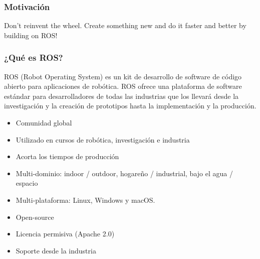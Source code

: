 \begin{frame}
	\frametitle{Motivación}
	
	Don’t reinvent the wheel. Create something new and do it faster and better by building on ROS!
	
	
	
	
	
	
\end{frame}

\begin{frame}
	\frametitle{¿Qué es ROS?}
	
	ROS (Robot Operating System) es un kit de desarrollo de software de código abierto para aplicaciones de robótica. ROS ofrece una plataforma de software estándar para desarrolladores de todas las industrias que los llevará desde la investigación y la creación de prototipos hasta la implementación y la producción.
	
	\begin{itemize}
		\item Comunidad global
		\item Utilizado en cursos de robótica, investigación e industria
		\item Acorta los tiempos de producción
		\item Multi-dominio: indoor / outdoor, hogareño / industrial, bajo el agua / espacio
		\item Multi-plataforma: Linux, Windows y macOS.
		\item Open-source
		\item Licencia permisiva (Apache 2.0)
		\item Soporte desde la industria
	\end{itemize}
	
	
	
	
\end{frame}

